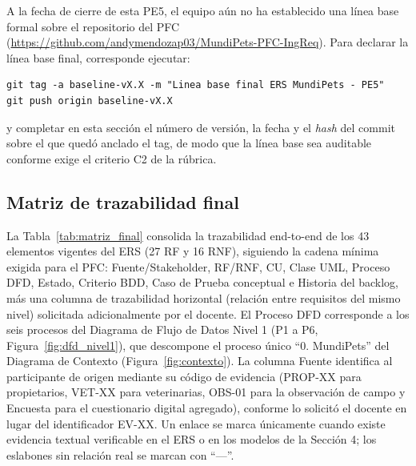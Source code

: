 \documentclass[journal,onecolumn]{IEEEtran}
\begin{document}
A la fecha de cierre de esta PE5, el equipo aún no ha establecido una
línea base formal sobre el repositorio del PFC
(\url{https://github.com/andymendozap03/MundiPets-PFC-IngReq}). Para
declarar la línea base final, corresponde ejecutar:

\begin{verbatim}
git tag -a baseline-vX.X -m "Linea base final ERS MundiPets - PE5"
git push origin baseline-vX.X
\end{verbatim}

\noindent y completar en esta sección el número de versión, la fecha y
el \textit{hash} del commit sobre el que quedó anclado el tag, de modo
que la línea base sea auditable conforme exige el criterio C2 de la
rúbrica.

\subsection{Matriz de trazabilidad final}

La Tabla~\ref{tab:matriz_final} consolida la trazabilidad end-to-end de
los 43 elementos vigentes del ERS (27 RF y 16 RNF), siguiendo la cadena
mínima exigida para el PFC: Fuente/Stakeholder, RF/RNF, CU, Clase UML,
Proceso DFD, Estado, Criterio BDD, Caso de Prueba conceptual e Historia
del backlog, más una columna de trazabilidad horizontal (relación entre
requisitos del mismo nivel) solicitada adicionalmente por el docente. El
Proceso DFD corresponde a los seis procesos del Diagrama de Flujo de
Datos Nivel 1 (P1 a P6, Figura~\ref{fig:dfd_nivel1}), que descompone el
proceso único ``0. MundiPets'' del Diagrama de Contexto
(Figura~\ref{fig:contexto}). La columna Fuente identifica al
participante de origen mediante su código de evidencia (PROP-XX para
propietarios, VET-XX para veterinarias, OBS-01 para la observación de
campo y Encuesta para el cuestionario digital agregado), conforme lo
solicitó el docente en lugar del identificador EV-XX. Un enlace se marca
únicamente cuando existe evidencia textual verificable en el ERS o en
los modelos de la Sección 4; los eslabones sin relación real se marcan
con ``---''.
\end{document}
